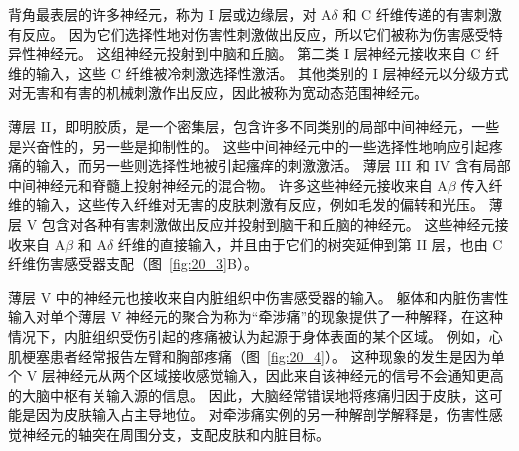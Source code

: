 背角最表层的许多神经元，称为 I 层或边缘层，对 A$ \delta $ 和 C 纤维传递的有害刺激有反应。
因为它们选择性地对伤害性刺激做出反应，所以它们被称为伤害感受特异性神经元。
这组神经元投射到中脑和丘脑。
第二类 I 层神经元接收来自 C 纤维的输入，这些 C 纤维被冷刺激选择性激活。
其他类别的 I 层神经元以分级方式对无害和有害的机械刺激作出反应，因此被称为宽动态范围神经元。


薄层 II，即明胶质，是一个密集层，包含许多不同类别的局部中间神经元，一些是兴奋性的，另一些是抑制性的。
这些中间神经元中的一些选择性地响应引起疼痛的输入，而另一些则选择性地被引起瘙痒的刺激激活。
薄层 III 和 IV 含有局部中间神经元和脊髓上投射神经元的混合物。
许多这些神经元接收来自 A$ \beta $ 传入纤维的输入，这些传入纤维对无害的皮肤刺激有反应，例如毛发的偏转和光压。
薄层 V 包含对各种有害刺激做出反应并投射到脑干和丘脑的神经元。
这些神经元接收来自 A$ \beta $ 和 A$\delta$ 纤维的直接输入，并且由于它们的树突延伸到第 II 层，也由 C 纤维伤害感受器支配（图~\ref{fig:20_3}B）。


薄层 V 中的神经元也接收来自内脏组织中伤害感受器的输入。
躯体和内脏伤害性输入对单个薄层 V 神经元的聚合为称为“牵涉痛”的现象提供了一种解释，在这种情况下，内脏组织受伤引起的疼痛被认为起源于身体表面的某个区域。 
例如，心肌梗塞患者经常报告左臂和胸部疼痛（图~\ref{fig:20_4}）。
这种现象的发生是因为单个 V 层神经元从两个区域接收感觉输入，因此来自该神经元的信号不会通知更高的大脑中枢有关输入源的信息。
因此，大脑经常错误地将疼痛归因于皮肤，这可能是因为皮肤输入占主导地位。
对牵涉痛实例的另一种解剖学解释是，伤害性感觉神经元的轴突在周围分支，支配皮肤和内脏目标。


